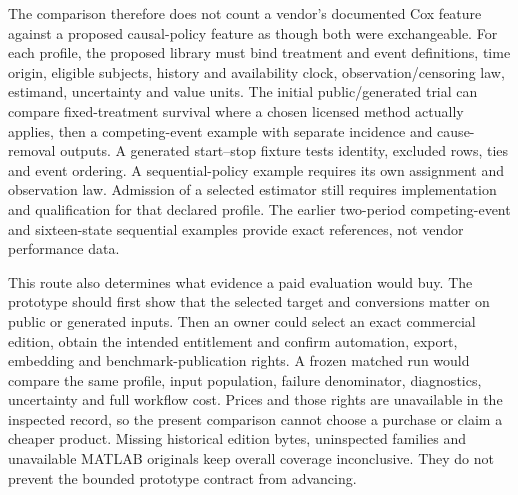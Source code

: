 The comparison therefore does not count a vendor's documented Cox feature
against a proposed causal-policy feature as though both were exchangeable.
For each profile, the proposed library must bind treatment and event
definitions, time origin, eligible subjects, history and availability clock,
observation/censoring law, estimand, uncertainty and value units. The initial
public/generated trial can compare fixed-treatment survival where a chosen
licensed method actually applies, then a competing-event example with separate
incidence and cause-removal outputs. A generated start--stop fixture tests
identity, excluded rows, ties and event ordering. A sequential-policy example
requires its own assignment and observation law. Admission of a selected
estimator still requires implementation and qualification for that declared
profile.
The earlier two-period competing-event and sixteen-state sequential examples
provide exact references, not vendor performance data.
\citep{exec14_survival_exact,exec16_commercial_matrix}

This route also determines what evidence a paid evaluation would buy. The
prototype should first show that the selected target and conversions matter
on public or generated inputs. Then an owner could select an exact commercial
edition, obtain the intended entitlement and confirm automation, export,
embedding and benchmark-publication rights. A frozen matched run would compare
the same profile, input population, failure denominator, diagnostics,
uncertainty and full workflow cost. Prices and those rights are unavailable
in the inspected record, so the present comparison cannot choose a purchase
or claim a cheaper product. Missing historical edition bytes, uninspected
families and unavailable MATLAB originals keep overall coverage inconclusive.
They do not prevent the bounded prototype contract from advancing.
\citep{exec16_commercial_matrix}
\label{exec16:commercial-matrix-end}
